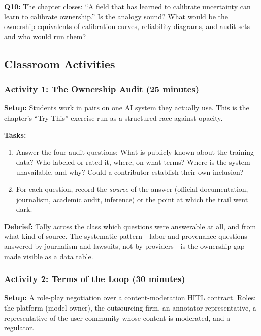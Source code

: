 \textbf{Q10:} The chapter closes: ``A field that has learned to calibrate uncertainty can learn to calibrate ownership.'' Is the analogy sound? What would be the ownership equivalents of calibration curves, reliability diagrams, and audit sets---and who would run them?

\subsection*{Classroom Activities}

\subsubsection*{Activity 1: The Ownership Audit (25 minutes)}

\textbf{Setup:} Students work in pairs on one AI system they actually use. This is the chapter's ``Try This'' exercise run as a structured race against opacity.

\textbf{Tasks:}
\begin{enumerate}
    \item Answer the four audit questions: What is publicly known about the training data? Who labeled or rated it, where, on what terms? Where is the system unavailable, and why? Could a contributor establish their own inclusion?
    \item For each question, record the \emph{source} of the answer (official documentation, journalism, academic audit, inference) or the point at which the trail went dark.
\end{enumerate}

\textbf{Debrief:} Tally across the class which questions were answerable at all, and from what kind of source. The systematic pattern---labor and provenance questions answered by journalism and lawsuits, not by providers---is the ownership gap made visible as a data table.

\subsubsection*{Activity 2: Terms of the Loop (30 minutes)}

\textbf{Setup:} A role-play negotiation over a content-moderation HITL contract. Roles: the platform (model owner), the outsourcing firm, an annotator representative, a representative of the user community whose content is moderated, and a regulator.

